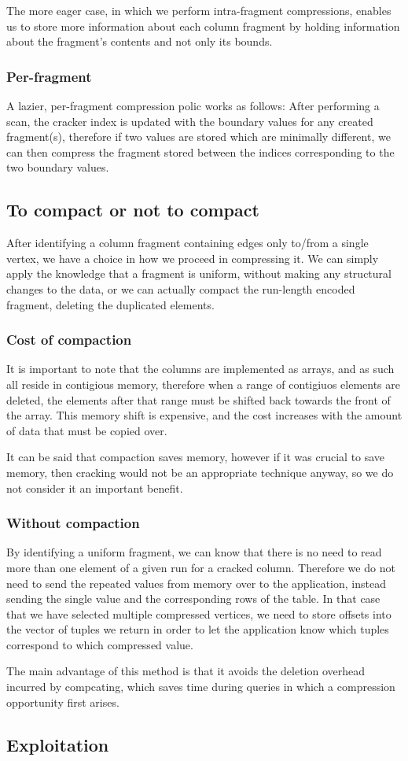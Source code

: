 The more eager case, in which we perform intra-fragment compressions, enables us to store more information about each column fragment by holding information about the fragment's contents and not
only its bounds.

\subsubsection{Per-fragment}

A lazier, per-fragment compression polic works as follows: After performing a scan, the cracker
index is updated with the boundary values for any created fragment(s), therefore if two values are
stored which are minimally different, we can then compress the fragment stored between the indices
corresponding to the two boundary values.

\subsection{To compact or not to compact}

After identifying a column fragment containing edges only to/from a single vertex, we have a choice 
in how we proceed in compressing it. We can simply apply the knowledge that a fragment is uniform,
without making any structural changes to the data, or we can actually compact the run-length
encoded fragment, deleting the duplicated elements.

\subsubsection{Cost of compaction}

It is important to note that the columns are implemented as arrays, and as such all reside in
contigious memory, therefore when a range of contigiuos elements are deleted, the elements after
that range must be shifted back towards the front of the array. This memory shift is expensive,
and the cost increases with the amount of data that must be copied over.

It can be said that compaction saves memory, however if it was crucial to save memory, then cracking
would not be an appropriate technique anyway, so we do not consider it an important benefit.

\subsubsection{Without compaction}

By identifying a uniform fragment, we can know that there is no need to read more than one element
of a given run for a cracked column. Therefore we do not need to send the repeated values from
memory over to the application, instead sending the single value and the corresponding rows of the
table. In that case that we have selected multiple compressed vertices, we need to store offsets
into the vector of tuples we return in order to let the application know which tuples correspond to
which compressed value.

The main advantage of this method is that it avoids the deletion overhead incurred by compcating,
which saves time during queries in which a compression opportunity first arises.

\subsection{Exploitation}

\label{ss:compressionexploitation}
